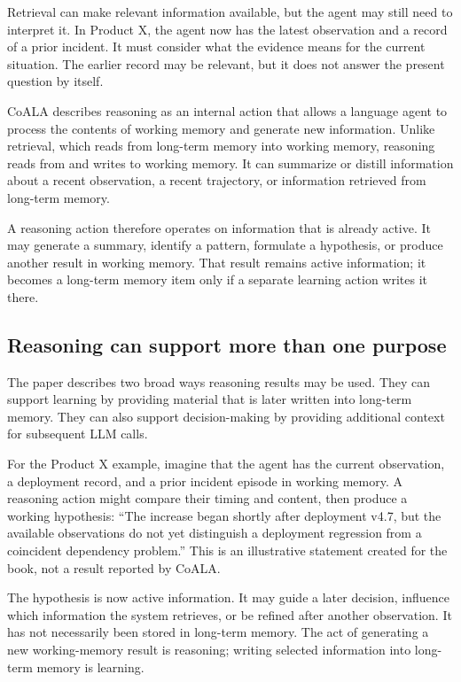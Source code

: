 Retrieval can make relevant information available, but the agent may still need to interpret it. In Product X, the agent now has the latest observation and a record of a prior incident. It must consider what the evidence means for the current situation. The earlier record may be relevant, but it does not answer the present question by itself.

CoALA describes reasoning as an internal action that allows a language agent to process the contents of working memory and generate new information. Unlike retrieval, which reads from long-term memory into working memory, reasoning reads from and writes to working memory. It can summarize or distill information about a recent observation, a recent trajectory, or information retrieved from long-term memory.

A reasoning action therefore operates on information that is already active. It may generate a summary, identify a pattern, formulate a hypothesis, or produce another result in working memory. That result remains active information; it becomes a long-term memory item only if a separate learning action writes it there.

\subsection{Reasoning can support more than one purpose}

The paper describes two broad ways reasoning results may be used. They can support learning by providing material that is later written into long-term memory. They can also support decision-making by providing additional context for subsequent LLM calls.

For the Product X example, imagine that the agent has the current observation, a deployment record, and a prior incident episode in working memory. A reasoning action might compare their timing and content, then produce a working hypothesis: ``The increase began shortly after deployment v4.7, but the available observations do not yet distinguish a deployment regression from a coincident dependency problem.'' This is an illustrative statement created for the book, not a result reported by CoALA.

The hypothesis is now active information. It may guide a later decision, influence which information the system retrieves, or be refined after another observation. It has not necessarily been stored in long-term memory. The act of generating a new working-memory result is reasoning; writing selected information into long-term memory is learning.

